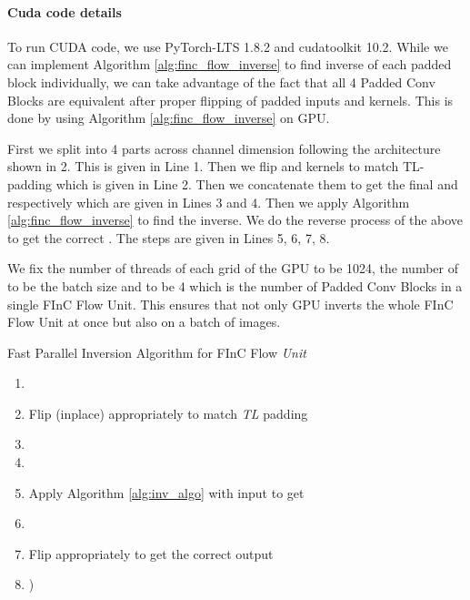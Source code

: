 \documentclass[a4paper,twoside]{article}
\theoremstyle{definition}
\begin{document}
\paragraph{Cuda code details}
To run CUDA code, we use PyTorch-LTS 1.8.2 and cudatoolkit 10.2. While we can implement Algorithm \ref{alg:finc_flow_inverse} to find inverse of each padded block individually, we can take advantage of the fact that all 4 Padded Conv Blocks are equivalent after proper flipping of padded inputs and kernels. This is done by using Algorithm \ref{alg:finc_flow_inverse} on GPU.

\noindent
First we split  into 4 parts across channel dimension following the architecture shown in 2. This is given in Line 1. Then we flip  and kernels to match TL-padding which is given in Line 2. Then we concatenate them to get the final  and  respectively which are given in Lines 3 and 4. Then we apply Algorithm \ref{alg:finc_flow_inverse} to find the inverse. We do the reverse process of the above to get the correct . The steps are given in Lines 5, 6, 7, 8.

\noindent
We fix the number of threads of each grid of the GPU to be 1024, the number of  to be the batch size and  to be 4 which is the number of Padded Conv Blocks in a single FInC Flow Unit. This ensures that not only GPU inverts the whole FInC Flow Unit at once but also on a batch of images. 

\begin{algorithm}[!h]
    \caption{Fast Parallel Inversion Algorithm for FInC Flow \emph{Unit}}
    \label{alg:finc_flow_inverse}
    \begin{enumerate}
        \item{ }
        \item{Flip  (inplace) appropriately to match \emph{TL} padding}
        \item{}
        \item{}
        \item{Apply Algorithm \ref{alg:inv_algo} with input   to get }
        \item{}
        \item{Flip  appropriately to get the correct output }
        \item{)}
    \end{enumerate}
\end{algorithm}
\end{document}
